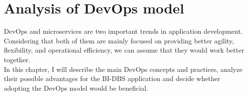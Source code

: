 \chapter{Analysis of DevOps model} DevOps and microservices are two important trends in application development. Considering that both of them are mainly focused on providing better agility, flexibility, and operational efficiency, we can assume that they would work better together.\cite{devops-micr}\\ 
In this chapter, I will describe the main DevOps concepts and practices, analyze their possible advantages for the BI-DBS application and decide whether adopting the DevOps model would be beneficial. 














